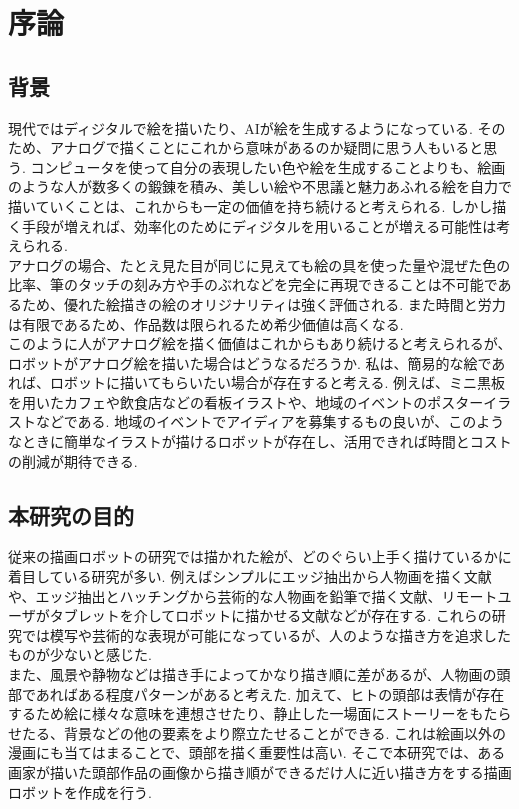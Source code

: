 \chapter{序論}
  \label{chap:intro}
  \section{背景}
    \label{sec:background}
	現代ではディジタルで絵を描いたり、AIが絵を生成するようになっている.	そのため、アナログで描くことにこれから意味があるのか疑問に思う人もいると思う. コンピュータを使って自分の表現したい色や絵を生成することよりも、絵画のような人が数多くの鍛錬を積み、美しい絵や不思議と魅力あふれる絵を自力で描いていくことは、これからも一定の価値を持ち続けると考えられる. しかし描く手段が増えれば、効率化のためにディジタルを用いることが増える可能性は考えられる.   
	\\\hspace{10pt}アナログの場合、たとえ見た目が同じに見えても絵の具を使った量や混ぜた色の比率、筆のタッチの刻み方や手のぶれなどを完全に再現できることは不可能であるため、優れた絵描きの絵のオリジナリティは強く評価される.	また時間と労力は有限であるため、作品数は限られるため希少価値は高くなる. 
	\\\hspace{10pt}このように人がアナログ絵を描く価値はこれからもあり続けると考えられるが、ロボットがアナログ絵を描いた場合はどうなるだろうか. 私は、簡易的な絵であれば、ロボットに描いてもらいたい場合が存在すると考える. 例えば、ミニ黒板を用いたカフェや飲食店などの看板イラストや、地域のイベントのポスターイラストなどである. 地域のイベントでアイディアを募集するもの良いが、このようなときに簡単なイラストが描けるロボットが存在し、活用できれば時間とコストの削減が期待できる. 
  \section{本研究の目的}
    \label{sec:target}
	従来の描画ロボットの研究では描かれた絵が、どのぐらい上手く描けているかに着目している研究が多い. 例えばシンプルにエッジ抽出から人物画を描く文献\cite{1}や、エッジ抽出とハッチングから芸術的な人物画を鉛筆で描く文献\cite{2}、リモートユーザがタブレットを介してロボットに描かせる文献\cite{3}などが存在する. これらの研究では模写や芸術的な表現が可能になっているが、人のような描き方を追求したものが少ないと感じた.
	\\\hspace{10pt}また、風景や静物などは描き手によってかなり描き順に差があるが、人物画の頭部であればある程度パターンがあると考えた.  加えて、ヒトの頭部は表情が存在するため絵に様々な意味を連想させたり、静止した一場面にストーリーをもたらせたる、背景などの他の要素をより際立たせることができる. これは絵画以外の漫画にも当てはまることで、頭部を描く重要性は高い.	そこで本研究では、ある画家が描いた頭部作品の画像から描き順ができるだけ人に近い描き方をする描画ロボットを作成を行う.\\
	

